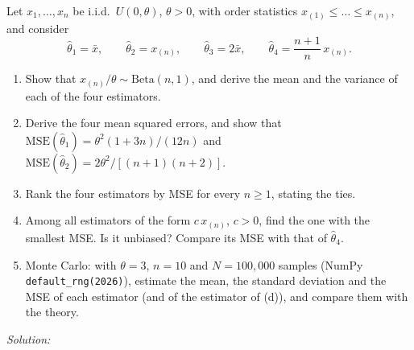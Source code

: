 \documentclass[11pt,a4paper]{article}
\newif\ifsolucoes
\newcommand{\espacoresol}{4.5cm}   %
\numberwithin{equation}{questao}   %
\newcommand{\resolespaco}{\ifsolucoes\else\par\textit{Solution:}\vspace{\espacoresol}\par\fi}
\begin{document}
Let $x_1,\dots,x_n$ be i.i.d.\ $U(0,\theta)$, $\theta>0$, with order statistics
$x_{(1)}\le\dots\le x_{(n)}$, and consider
\[
\hat\theta_1=\bar x,\qquad \hat\theta_2=x_{(n)},\qquad \hat\theta_3=2\bar x,\qquad
\hat\theta_4=\frac{n+1}{n}\,x_{(n)} .
\]
\begin{enumerate}[label=(\alph*),leftmargin=2.4em]
\item Show that $x_{(n)}/\theta\sim\mathrm{Beta}(n,1)$, and derive the mean and the variance of each
of the four estimators.
\item Derive the four mean squared errors, and show that
$\mathrm{MSE}(\hat\theta_1)=\theta^2(1+3n)/(12n)$ and
$\mathrm{MSE}(\hat\theta_2)=2\theta^2/[(n+1)(n+2)]$.
\item Rank the four estimators by MSE for every $n\ge1$, stating the ties.
\item Among all estimators of the form $c\,x_{(n)}$, $c>0$, find the one with the smallest MSE. Is it
unbiased? Compare its MSE with that of $\hat\theta_4$.
\item Monte Carlo: with $\theta=3$, $n=10$ and $N=100{,}000$ samples (NumPy
\texttt{default\_rng(2026)}), estimate the mean, the standard deviation and the MSE of each estimator
(and of the estimator of (d)), and compare them with the theory.
\end{enumerate}
\resolespaco
\end{document}
